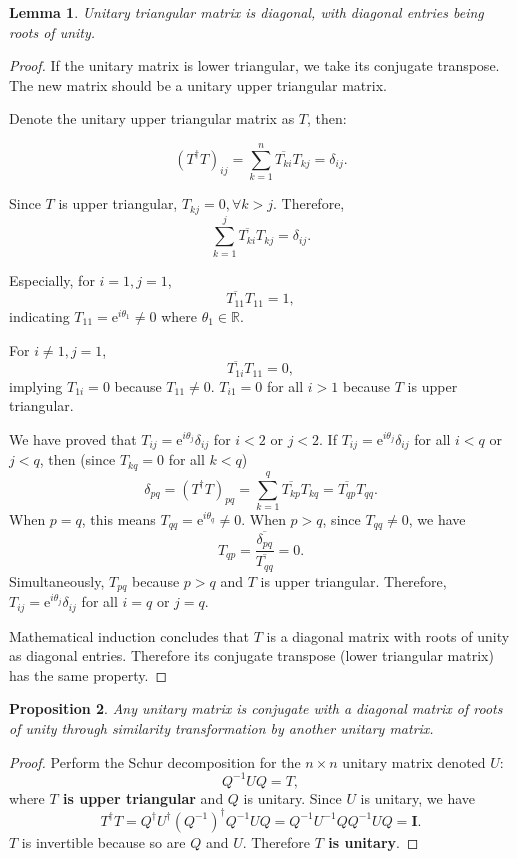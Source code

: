\documentclass[12pt, letterpaper]{article}
\newcommand{\re}{\mathbb{R}}
\newcommand{\ee}{\mathrm{e}}
\newcommand{\idm}{\mathbf{I}}
\newcommand{\hadj}[1]{{#1}^{\dagger}}
\newcommand{\conj}{\overline}
\DeclareMathOperator{\diag}{diag}
\newtheorem{prop}{Proposition}[section]
\newtheorem{lem}[prop]{Lemma}
\theoremstyle{definition}
\theoremstyle{remark}
\theoremstyle{definition}
\theoremstyle{plain}
\begin{document}
	\begin{lem}
		Unitary triangular matrix is diagonal, with diagonal entries being roots of unity.
	\end{lem}
	\begin{proof}
		If the unitary matrix is lower triangular, we take its conjugate transpose.
		The new matrix should be a unitary upper triangular matrix.
		
		Denote the unitary upper triangular matrix as $T$, then:
		
		\[(\hadj{T}T)_{ij}=\sum_{k=1}^{n}\conj{T_{ki}}T_{kj}=\delta_{ij}. \]
		
		Since $T$ is upper triangular, $T_{kj}=0,\forall k>j$. Therefore,
		\[\sum_{k=1}^{j}\conj{T_{ki}}T_{kj}=\delta_{ij}.\]
		
		Especially, for $i=1,j=1$,
		\[\conj{T_{11}}T_{11}=1,\]
		indicating $T_{11}=\ee^{i\theta_1}\ne0$ where $\theta_1\in\re$.
		
		For $i\ne1,j=1$,
		\[\conj{T_{1i}}T_{11}=0, \]
		implying $T_{1i}=0$ because $T_{11}\ne0$.
		$T_{i1}=0$ for all $i>1$ because $T$ is upper triangular.
		
		We have proved that $T_{ij}=\ee^{i\theta_j}\delta_{ij}$ for $i<2$ or $j<2$.
		If $T_{ij}=\ee^{i\theta_j}\delta_{ij}$ for all $i< q$ or $j<q$,
		then (since $T_{kq}=0$ for all $k<q$)
		\[\delta_{pq}=(\hadj{T}T)_{pq}=\sum_{k=1}^{q}\conj{T_{kp}}T_{kq}=\conj{T_{qp}}T_{qq}. \]
		When $p=q$, this means $T_{qq}=\ee^{i\theta_q}\ne0$.
		When $p>q$, since $T_{qq}\ne0$, we have
		\[T_{qp}=\frac{\conj{\delta_{pq}}}{\conj{T_{qq}}}=0.\]
		Simultaneously, $T_{pq}$ because $p>q$ and $T$ is upper triangular.
		Therefore, $T_{ij}=\ee^{i\theta_j}\delta_{ij}$ for all $i= q$ or $j=q$.
		
		Mathematical induction concludes that $T$ is a diagonal matrix with roots of unity as diagonal entries.
		Therefore its conjugate transpose (lower triangular matrix) has the same property.
	\end{proof}
	\begin{prop}
		Any unitary matrix is conjugate with a diagonal matrix of roots of unity
		through similarity transformation by another unitary matrix.
	\end{prop}
	\begin{proof}
		Perform the Schur decomposition for the $n\times n$ unitary matrix denoted $U$:
		\[ Q^{-1}UQ=T, \]
		where \textbf{$T$ is upper triangular} and $Q$ is unitary.
		Since $U$ is unitary, we have
		\[ \hadj{T}T = \hadj{Q}\hadj{U}\hadj{(Q^{-1})}Q^{-1}UQ=Q^{-1}U^{-1}QQ^{-1}UQ=\idm.\]
		$T$ is invertible because so are $Q$ and $U$.
		Therefore \textbf{$T$ is unitary}.
		
		
	\end{proof}
	
\end{document}
